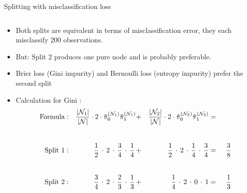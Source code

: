 \begin{vbframe}{Splitting with misclassification loss}
\begin{small}
\begin{columns}[T,onlytextwidth]
\begin{center}
\end{center}
\end{columns}
\end{small}

\lz

\begin{itemize}
\item Both splits are equivalent in terms of misclassification error, they each misclassify 200 observations. 
\item But: Split 2 produces one pure node and is probably preferable.
\item Brier loss (Gini impurity) and Bernoulli loss (entropy impurity) prefer the second split
\item Calculation for Gini \href{https://CRAN.R-project.org/package=mfx}{\citet{bengio2004}} :\\
\begin{alignat*}{6}
\text{Formula}&:& \frac{|\Nl|}{|\Np|}\cdot 2 \cdot\pikNlh[0]\pikNlh[1] &+& \frac{|\Nr|}{|\Np|}\cdot 2 \cdot \pikNrh[0]\pikNrh[1] &=& \\[5ex]
\text{Split 1}&:& \,\, \frac{1}{2} \,\cdot \, 2 \,\cdot\, \frac{3}{4} \,\cdot\, \frac{1}{4} \,&+&\,  \, \frac{1}{2} \,\cdot\, 2 \, \cdot\, \frac{1}{4} \,\cdot\, \frac{3}{4} &=&\;\, \frac{3}{8}\\[5ex]
\text{Split 2}&:& \frac{3}{4}\, \cdot\, 2 \,\cdot\,\frac{2}{3}\,\cdot\,\frac{1}{3}\, &+& \frac{1}{4} \,\cdot\, 2 \,\cdot\, 0 \,\cdot\, 1 &=&\; \,\frac{1}{3}
\end{alignat*}
\end{itemize}
\end{vbframe}

\href{https://CRAN.R-project.org/package=mfx}{\citet{bengio2004}} 






\endlecture

